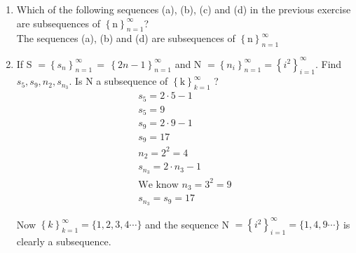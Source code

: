 \documentclass[11pt, letterpaper]{article}
\begin{document}
\begin{enumerate}
{\begin{enumerate}
\end{enumerate} } 

\item {Which of the following sequences (a), (b), (c) and (d) in the previous exercise are subsequences of $\left\lbrace \mathrm{n} \right\rbrace_{n=1}^\infty$?\\

The sequences (a), (b) and (d) are subsequences of $\left\lbrace \mathrm{n} \right\rbrace_{n=1}^\infty$
}

\item {If S $= \left\lbrace s_n \right\rbrace_{n=1}^\infty \, = \, \left\lbrace 2n-1 \right\rbrace_{n=1}^\infty $ and N $= \left\lbrace n_i \right\rbrace_{n=1}^\infty = \left\lbrace i^2\right\rbrace_{i=1}^\infty.$ Find $s_5, s_9, n_2, s_{n_3}$. Is N a subsequence of $\left\lbrace \mathrm{k}\right\rbrace_{k=1}^\infty$ ?\\

\begin{eqnarray*}
s_5 = 2 \cdot 5 - 1\\
s_5 = 9 \\
s_9 = 2 \cdot 9 -1\\
s_9 = 17\\
n_2 = 2^2 = 4\\
s_{n_3} = 2 \cdot n_3 - 1\\
\mathrm{We \,\, know \,\, } n_3 = 3^2 = 9\\
s_{n_3} = s_9 = 17
\end{eqnarray*}

Now $\left\lbrace k\right\rbrace_{k=1}^\infty = \lbrace 1, 2, 3, 4 \cdots \rbrace$ and the sequence N $=\left\lbrace i^2\right\rbrace_{i=1}^\infty = \lbrace 1, 4, 9 \cdots \rbrace$ is clearly a subsequence.
}
\end{enumerate}
\clearpage
\end{document}
